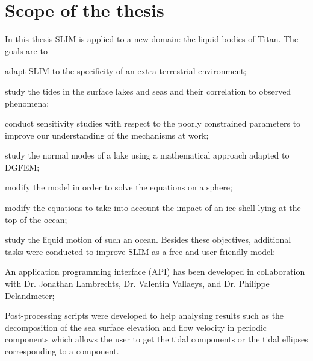 \section{Scope of the thesis}
In this thesis SLIM is applied to a new domain: the liquid bodies of Titan. The goals are to 
\BI
\item adapt SLIM to the specificity of an extra-terrestrial environment;
\item study the tides in the surface lakes and seas and their correlation to observed phenomena;
\item conduct sensitivity studies with respect to the poorly constrained parameters to improve our understanding of the mechanisms at work; 
\item study the normal modes of a lake using a mathematical approach adapted to DGFEM;
\item modify the model in order to solve the equations on a sphere;
\item modify the equations to take into account the impact of an ice shell lying at the top of the ocean;
\item study the liquid motion of such an ocean.
\EI
Besides these objectives, additional tasks were conducted to improve SLIM as a free and user-friendly model:
\BI
\item An application programming interface (API) has been developed in collaboration with Dr. Jonathan Lambrechts, Dr. Valentin Vallaeys, and Dr. Philippe Delandmeter;
\item Post-processing scripts were developed to help analysing results such as the decomposition of the sea surface elevation and flow velocity in periodic components which allows the user to get the tidal components or the tidal ellipses corresponding to a component.
\EI

